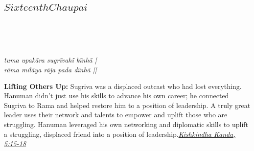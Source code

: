\subsection*{ \(Sixteenth Chaupai\)}


\begin{minipage}[t]{0.55\textwidth}
\vspace{0pt}
{\large \linespread{1.5}\selectfont
{}\\
\par}

\vspace{0.5em}

{\large \linespread{1.5}\selectfont
{}\\
\par}

\vspace{0.5em}

{\large \linespread{1.3}\selectfont
\textit{tuma upakāra sugrīvahĩ kīnhā |}\\
\textit{rāma milāya rāja pada dīnhā ||}
\par}
\end{minipage}%
\hfill
\begin{minipage}[t]{0.42\textwidth}
\vspace{0pt}
\begin{tcolorbox}[anchorbox]
\textbf{Lifting Others Up:} Sugriva was a displaced outcast who had lost everything. Hanuman didn't just use his skills to advance his own career; he connected Sugriva to Rama and helped restore him to a position of leadership. A truly great leader uses their network and talents to empower and uplift those who are struggling.
\vspace{0.5em}\newline Hanuman leveraged his own networking and diplomatic skills to uplift a struggling, displaced friend into a position of leadership.\newline\null\hfill\href{https://www.valmiki.iitk.ac.in/sloka?field_kanda_tid=4&language=dv&field_sarga_value=5}{\textit{Kishkindha Kanda, 5:15-18}}
\end{tcolorbox}
\end{minipage}


\vspace{0.5em}
